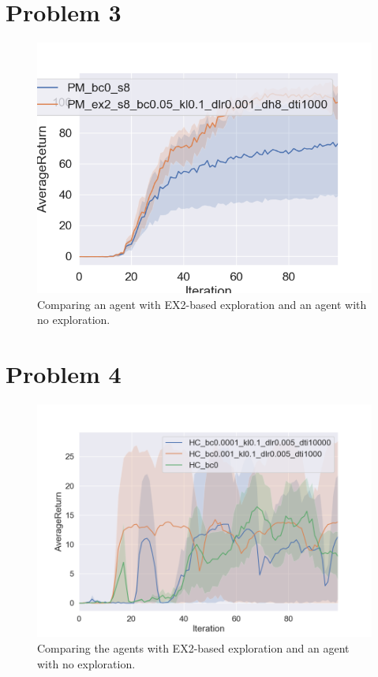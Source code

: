 \documentclass[a4paper]{article}
\begin{document}
\pagebreak

\section*{Problem 3}
\begin{figure}[H]
\centering
\includegraphics[width=1\textwidth]{p3.png}
\caption{Comparing an agent with EX2-based exploration and an agent with no exploration.}
\end{figure}

\pagebreak

\section*{Problem 4}
\begin{figure}[H]
\centering
\includegraphics[width=1\textwidth]{p4.png}
\caption{Comparing the agents with EX2-based exploration and an agent with no exploration.}
\end{figure}
\end{document}
